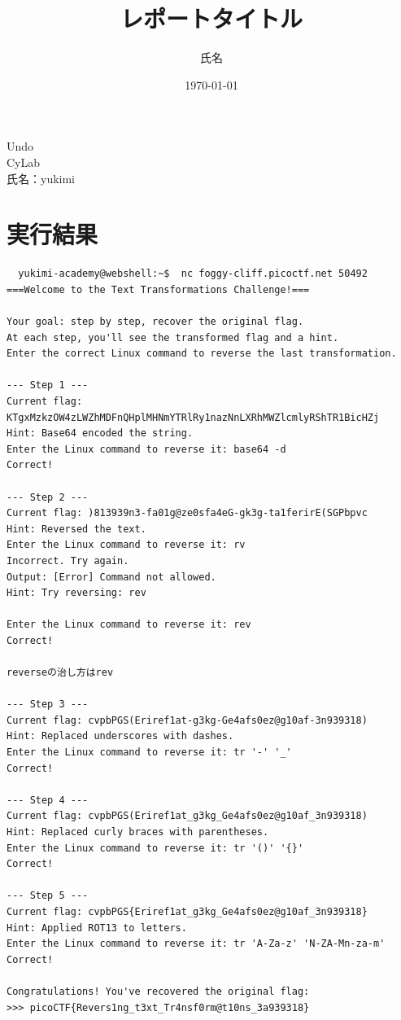 \documentclass[a4paper,11pt,lualatex,ja=standard]{bxjsarticle}
\newcommand{\cover}[3]{
  \thispagestyle{empty}
  \vspace*{4cm}
  \begin{center}
    {\LARGE #1}\\[2cm]
    {\Large #2}\\[3cm]
    {\large 氏名：#3}\\[1cm]
  \end{center}
  \newpage
}
\begin{document}
\cover{Undo}{CyLab}{yukimi}

\title{レポートタイトル}
\author{氏名}
\date{\today}

\section{実行結果}
\begin{verbatim}
  yukimi-academy@webshell:~$  nc foggy-cliff.picoctf.net 50492
===Welcome to the Text Transformations Challenge!===

Your goal: step by step, recover the original flag.
At each step, you'll see the transformed flag and a hint.
Enter the correct Linux command to reverse the last transformation.

--- Step 1 ---
Current flag: KTgxMzkzOW4zLWZhMDFnQHplMHNmYTRlRy1nazNnLXRhMWZlcmlyRShTR1BicHZj
Hint: Base64 encoded the string.
Enter the Linux command to reverse it: base64 -d
Correct!

--- Step 2 ---
Current flag: )813939n3-fa01g@ze0sfa4eG-gk3g-ta1ferirE(SGPbpvc
Hint: Reversed the text.
Enter the Linux command to reverse it: rv
Incorrect. Try again.
Output: [Error] Command not allowed.
Hint: Try reversing: rev

Enter the Linux command to reverse it: rev
Correct!

reverseの治し方はrev

--- Step 3 ---
Current flag: cvpbPGS(Eriref1at-g3kg-Ge4afs0ez@g10af-3n939318)
Hint: Replaced underscores with dashes.
Enter the Linux command to reverse it: tr '-' '_'
Correct!

--- Step 4 ---
Current flag: cvpbPGS(Eriref1at_g3kg_Ge4afs0ez@g10af_3n939318)
Hint: Replaced curly braces with parentheses.
Enter the Linux command to reverse it: tr '()' '{}'
Correct!

--- Step 5 ---
Current flag: cvpbPGS{Eriref1at_g3kg_Ge4afs0ez@g10af_3n939318}
Hint: Applied ROT13 to letters.
Enter the Linux command to reverse it: tr 'A-Za-z' 'N-ZA-Mn-za-m'
Correct!

Congratulations! You've recovered the original flag:
>>> picoCTF{Revers1ng_t3xt_Tr4nsf0rm@t10ns_3a939318}

\end{verbatim}
\end{document}
